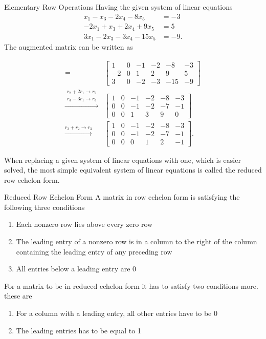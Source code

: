 \begin{example}{Elementary Row Operations}
 Having the given system of linear equations
\begin{align*}
    x_1-x_3-2x_4-8x_5&=-3\\
    -2x_1+x_3+2x_4+9x_5 &= 5\\
    3x_1-2x_3-3x_4-15x_5&=-9.
\end{align*}
The augmented matrix can be written as

\begin{align*}
[A \textbf{b}] =
	&\begin{bmatrix}
	1  & 0  & -1  &-2  & -8  & -3 \\
	-2 & 0  & 1   & 2  & 9   & 5 \\
	3  & 0  & -2  & -3 & -15 & -9 
   \end{bmatrix} \\
  \xrightarrow{\substack{r_2+2r_1\rightarrow r_2\\  r_3-3r_1\rightarrow r_3}}
  &\begin{bmatrix}
 	 1 & 0 & -1 &-2  & -8 & -3 \\
 	 0 & 0 & -1 & -2 & -7 & -1 \\
	 0 & 0 & 1  & 3  & 9  & 0
  \end{bmatrix}\\
  \xrightarrow{r_3+r_2\rightarrow r_3}
    &\begin{bmatrix}
  	 1 & 0 & -1 &-2  & -8 & -3 \\
 	 0 & 0 & -1 & -2 & -7 & -1 \\
	 0 & 0 & 0  & 1  & 2  & -1
       \end{bmatrix}.
\end{align*}
\label{exa:rowoperations}
\end{example}
When replacing a given system of linear equations with one, which is easier solved, the most simple equivalent system of linear equations is called the reduced row echelon form. 
\begin{definition}{Reduced Row Echelon Form}
A matrix in row echelon form is satisfying the following three conditions
\begin{enumerate}
    \item Each nonzero row lies above every zero row
    \item The leading entry of a nonzero row is in a column to the right of the column containing the leading entry of any preceding row
    \item All entries below a leading entry are $0$
\end{enumerate}
For a matrix to be in reduced echelon form it has to satisfy two conditions more. these are
\begin{enumerate}
    \item For a column with a leading entry, all other entries have to be 0
    \item The leading entries has to be equal to 1
\end{enumerate}
\cite[33]{LiAl}
\end{definition}
